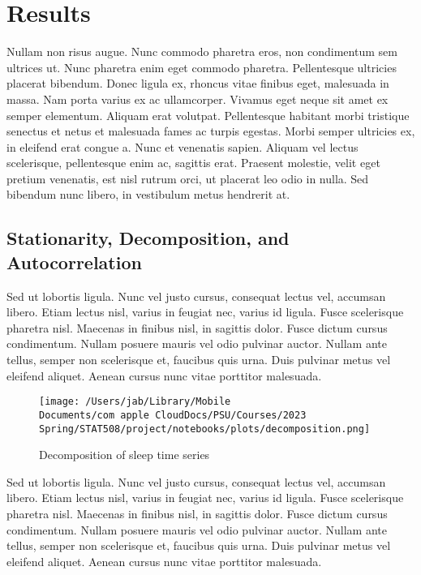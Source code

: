 \documentclass{article}
\begin{document}
\hypertarget{results}{%
\section{Results}\label{results}}

Nullam non risus augue. Nunc commodo pharetra eros, non condimentum sem
ultrices ut. Nunc pharetra enim eget commodo pharetra. Pellentesque
ultricies placerat bibendum. Donec ligula ex, rhoncus vitae finibus
eget, malesuada in massa. Nam porta varius ex ac ullamcorper. Vivamus
eget neque sit amet ex semper elementum. Aliquam erat volutpat.
Pellentesque habitant morbi tristique senectus et netus et malesuada
fames ac turpis egestas. Morbi semper ultricies ex, in eleifend erat
congue a. Nunc et venenatis sapien. Aliquam vel lectus scelerisque,
pellentesque enim ac, sagittis erat. Praesent molestie, velit eget
pretium venenatis, est nisl rutrum orci, ut placerat leo odio in nulla.
Sed bibendum nunc libero, in vestibulum metus hendrerit at.

\hypertarget{stationarity-decomposition-and-autocorrelation}{%
\subsection{Stationarity, Decomposition, and
Autocorrelation}\label{stationarity-decomposition-and-autocorrelation}}

Sed ut lobortis ligula. Nunc vel justo cursus, consequat lectus vel,
accumsan libero. Etiam lectus nisl, varius in feugiat nec, varius id
ligula. Fusce scelerisque pharetra nisl. Maecenas in finibus nisl, in
sagittis dolor. Fusce dictum cursus condimentum. Nullam posuere mauris
vel odio pulvinar auctor. Nullam ante tellus, semper non scelerisque et,
faucibus quis urna. Duis pulvinar metus vel eleifend aliquet. Aenean
cursus nunc vitae porttitor malesuada.

\begin{figure}[h]
\centering
  \texttt{[image: /Users/jab/Library/Mobile Documents/com~apple~CloudDocs/PSU/Courses/2023 Spring/STAT508/project/notebooks/plots/decomposition.png]}
\caption{Decomposition of sleep time series}
\end{figure}

Sed ut lobortis ligula. Nunc vel justo cursus, consequat lectus vel,
accumsan libero. Etiam lectus nisl, varius in feugiat nec, varius id
ligula. Fusce scelerisque pharetra nisl. Maecenas in finibus nisl, in
sagittis dolor. Fusce dictum cursus condimentum. Nullam posuere mauris
vel odio pulvinar auctor. Nullam ante tellus, semper non scelerisque et,
faucibus quis urna. Duis pulvinar metus vel eleifend aliquet. Aenean
cursus nunc vitae porttitor malesuada.
\end{document}
